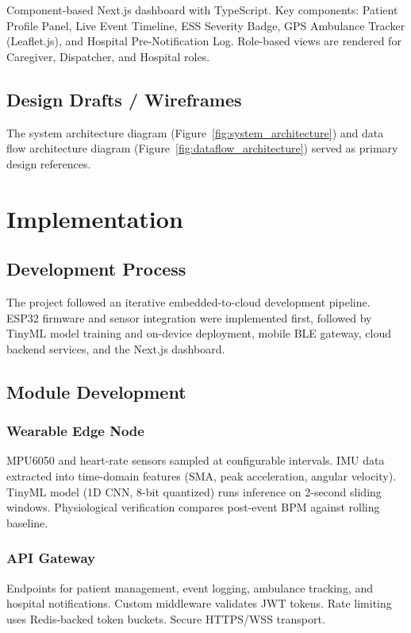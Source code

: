 Component-based Next.js dashboard with TypeScript. Key components: Patient Profile Panel, Live Event Timeline, ESS Severity Badge, GPS Ambulance Tracker (Leaflet.js), and Hospital Pre-Notification Log. Role-based views are rendered for Caregiver, Dispatcher, and Hospital roles.

\subsection{Design Drafts / Wireframes}

The system architecture diagram (Figure~\ref{fig:system_architecture}) and data flow architecture diagram (Figure~\ref{fig:dataflow_architecture}) served as primary design references.

\section[Implementation]{\textbf{Implementation}}

\subsection{Development Process}

The project followed an iterative embedded-to-cloud development pipeline. ESP32 firmware and sensor integration were implemented first, followed by TinyML model training and on-device deployment, mobile BLE gateway, cloud backend services, and the Next.js dashboard.

\subsection{Module Development}

\subsubsection{Wearable Edge Node}
MPU6050 and heart-rate sensors sampled at configurable intervals. IMU data extracted into time-domain features (SMA, peak acceleration, angular velocity). TinyML model (1D CNN, 8-bit quantized) runs inference on 2-second sliding windows. Physiological verification compares post-event BPM against rolling baseline.

\subsubsection{API Gateway}
Endpoints for patient management, event logging, ambulance tracking, and hospital notifications. Custom middleware validates JWT tokens. Rate limiting uses Redis-backed token buckets. Secure HTTPS/WSS transport.

